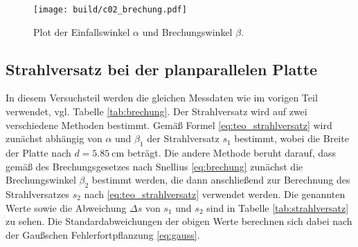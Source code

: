 \begin{figure}[H]
    \centering
    \texttt{[image: build/c02\_brechung.pdf]}
    \caption[]{Plot der Einfallswinkel $\alpha$ und Brechungswinkel $\beta$.}
    \label{fig:brechung}
\end{figure}






\subsection{Strahlversatz bei der planparallelen Platte}
In diesem Versuchsteil werden die gleichen Messdaten wie im vorigen Teil verwendet, vgl. Tabelle \ref{tab:brechung}.
Der Strahlversatz wird auf zwei verschiedene Methoden bestimmt.
Gemäß Formel \eqref{eq:teo_strahlversatz} wird zunächst abhängig von $\alpha$ und $\beta_1$ der Strahlversatz $s_1$ bestimmt,
wobei die Breite der Platte nach \cite[]{man:v400} $d = \qty[]{5.85}{\cm}$ beträgt.
Die andere Methode beruht darauf, dass gemäß des Brechungsgesetzes nach Snellius \eqref{eq:brechung} zunächst die Brechungswinkel
$\beta_2$ bestimmt werden, die dann anschließend zur Berechnung des Strahlversatzes $s_2$ nach \eqref{eq:teo_strahlversatz} verwendet werden.
Die genannten Werte sowie die Abweichung $\Delta s$ von $s_1$ und $s_2$ sind in Tabelle \ref{tab:strahlversatz} zu sehen.
Die Standardabweichungen der obigen Werte berechnen sich dabei nach der Gaußschen Fehlerfortpflanzung \eqref{eq:gauss}.

